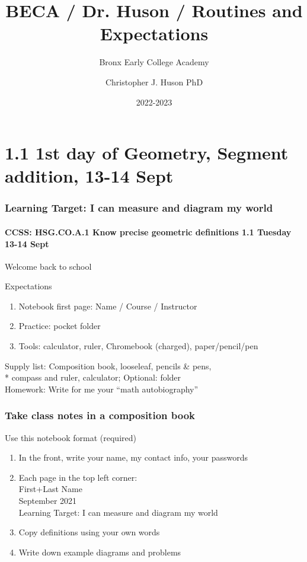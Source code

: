 \documentclass{beamer}
\title{BECA / Dr. Huson / Routines and Expectations}
\subtitle[BECA]{Bronx Early College Academy}
\author[Huson]{Christopher J. Huson PhD}
\date{2022-2023}
\begin{document}
\frame{\titlepage}

\section[Outline]{}
\frame{\tableofcontents}

\section{1.1 1st day of Geometry, Segment addition, 13-14 Sept}
\frame
{
  \frametitle{Learning Target: I can measure and diagram my world}
  \framesubtitle{CCSS: HSG.CO.A.1 Know precise geometric definitions \hfill \alert{1.1 Tuesday 13-14 Sept}}

  Welcome back to school
  \begin{block}{Expectations}
  \begin{enumerate}
      \item Notebook first page: Name / Course / Instructor
      \item Practice: pocket folder
      \item Tools: calculator, ruler, Chromebook (charged), paper/pencil/pen
  \end{enumerate}
  \end{block}
  Supply list: Composition book, looseleaf, pencils \& pens, \\*
  compass and ruler, calculator; Optional: folder \\[0.25cm]
  Homework: Write for me your ``math autobiography''
}

\frame
{
  \frametitle{Take class notes in a composition book}
  \begin{block}{Use this notebook format (required)}
    \begin{enumerate}
      \item In the front, write your name, my contact info, your passwords
      \item Each page in the top left corner: \\ \qquad First+Last Name \\
       September 2021 \\ \qquad Learning Target: I can measure and diagram my world \vspace{0.25cm}
      \item Copy definitions using your own words
      \item Write down example diagrams and problems
    \end{enumerate}
    \end{block}
}
\end{document}
